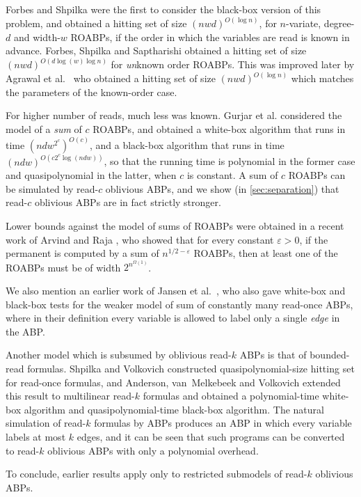 \documentclass[11pt]{article}
\def\epsilon{\varepsilon} %
\let\eps\epsilon
\begin{document}
Forbes and Shpilka \cite{FS13} were the first to consider the black-box version of this problem, and obtained a hitting set of size $(nwd)^{O(\log n)}$, for $n$-variate, degree-$d$ and width-$w$ ROABPs, if the order in which the variables are read is known in advance. Forbes, Shpilka and Saptharishi \cite{FSS14} obtained a hitting set of size $(nwd)^{O(d \log(w) \log n)}$ for {\em un}known order ROABPs. This was improved later by Agrawal et al.\ \cite{agks15} who obtained a hitting set of size $(nwd)^{O(\log n)}$ which matches the parameters of the known-order case.

For higher number of reads, much less was known. Gurjar et al. \cite{GKST15} considered the model of a {\em sum} of $c$ ROABPs, and obtained a white-box algorithm that runs in time $(ndw^{2^c})^{O(c)}$, and a black-box algorithm that runs in time $(ndw)^{O(c 2^c \log(ndw))}$, so that the running time is polynomial in the former case and quasipolynomial in the latter, when $c$ is constant. A sum of $c$ ROABPs can be simulated by read-$c$ oblivious ABPs, and we show (in \autoref{sec:separation}) that read-$c$ oblivious ABPs are in fact strictly stronger.

Lower bounds against the model of sums of ROABPs were obtained in a recent work of Arvind and Raja \cite{AR15}, who showed that for every constant $\eps >0$, if the permanent is computed by a sum of $n^{1/2-\eps}$ ROABPs, then at least one of the ROABPs must be of width $2^{n^{\Omega(1)}}$.

We also mention an earlier work of Jansen et al.\ \cite{JQS10}, who also gave white-box and black-box tests for the weaker model of sum of constantly many read-once ABPs, where in their definition every variable is allowed to label only a single {\em edge} in the ABP.

Another model which is subsumed by oblivious read-$k$ ABPs is that of bounded-read formulas. Shpilka and Volkovich \cite{SV15} constructed quasipolynomial-size hitting set for read-once formulas, and Anderson, van~Melkebeek and Volkovich \cite{amv11} extended this result to multilinear read-$k$ formulas and obtained a polynomial-time white-box algorithm and quasipolynomial-time black-box algorithm. The natural simulation of read-$k$ formulas by ABPs produces an ABP in which every variable labels at most $k$ edges, and it can be seen that such programs can be converted to read-$k$ oblivious ABPs with only a polynomial overhead.

To conclude, earlier results apply only to restricted submodels of read-$k$ oblivious ABPs.
\end{document}
